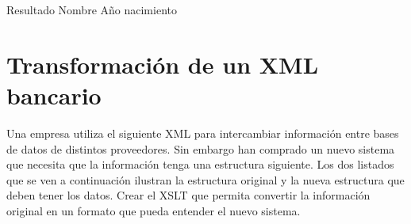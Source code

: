 \documentclass[letterpaper,10pt,spanish]{sphinxmanual}
\begin{document}
\begin{sphinxVerbatim}[commandchars=\\\{\}]
 
        Resultado
             
                    Nombre
                    Año nacimiento
                 
                         
                         
\end{sphinxVerbatim}


\section{Transformación de un XML bancario}
\label{\detokenize{ejercicios/xslt/anexo_ejercicios_xslt:transformacion-de-un-xml-bancario}}
Una empresa utiliza el siguiente XML para intercambiar información entre bases de datos de distintos proveedores. Sin embargo han comprado un nuevo sistema que necesita que la información tenga una estructura siguiente. Los dos listados que se ven a continuación ilustran la estructura original y la nueva estructura que deben tener los datos. Crear el XSLT que permita convertir la información original en un formato que pueda entender el nuevo sistema.
\end{document}
